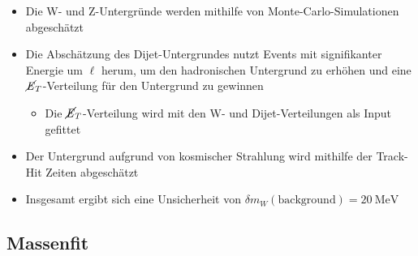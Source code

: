 \documentclass[aspectratio=1610, 9pt]{beamer}
\begin{document}
\begin{frame}
  \begin{itemize}
    \item Die W- und Z-Untergründe werden mithilfe von Monte-Carlo-Simulationen abgeschätzt
    \item Die Abschätzung des Dijet-Untergrundes nutzt Events mit signifikanter Energie um $\ell$ herum, um den hadronischen Untergrund zu erhöhen und eine $\cancel{\it{E}}_{T}$-Verteilung für den Untergrund zu gewinnen
    \begin{itemize}
      \item[\rightarrow] Die $\cancel{\it{E}}_{T}$-Verteilung wird mit den W- und Dijet-Verteilungen als Input gefittet
    \end{itemize}
    \item Der Untergrund aufgrund von kosmischer Strahlung wird mithilfe der Track-Hit Zeiten abgeschätzt
    \item Insgesamt ergibt sich eine Unsicherheit von $\delta m_W (\text{background}) = \SI{20}{\MeV}$
  \end{itemize}
\end{frame}

\subsection{Massenfit}
\end{document}
